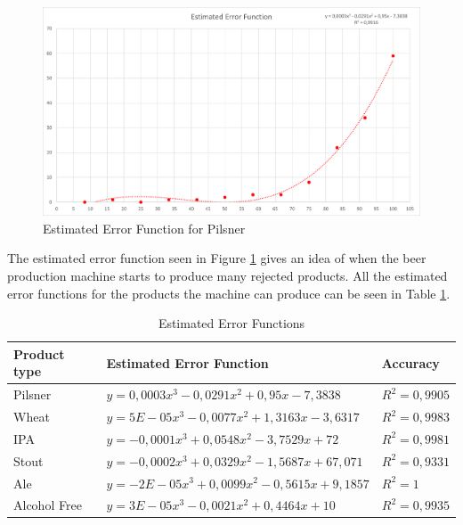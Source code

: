 
\begin{figure}[ht]
	\centering
	\includegraphics[width=1\linewidth]{images/errorfunction/pilsner.png}
	\caption{Estimated Error Function for Pilsner}
	\label{figure:ef_pilsner}
\end{figure}

The estimated error function seen in Figure \ref{figure:ef_pilsner} gives an
idea of when the beer production machine starts to produce many rejected
products. All the estimated error functions for the products the machine can
produce can be seen in Table \ref{table:eef}.

\begin{table}[ht]
     \begin{tabularx}{\textwidth}{|>{\RaggedRight}p{3cm}|>{\RaggedRight}X|>{\RaggedRight}p{3cm}|}
     \hline
     \textbf{Product type} & \textbf{Estimated Error Function} & \textbf{Accuracy} \\
     \hline
     Pilsner & \(y = 0,0003x^3 - 0,0291x^2 + 0,95x - 7,3838\) & \(R^2 = 0,9905\) \\
     \hline
     Wheat & \(y = 5E-05x^3 - 0,0077x^2 + 1,3163x - 3,6317\) & \(R^2 = 0,9983\) \\
     \hline
     IPA & \(y = -0,0001x^3 + 0,0548x^2 - 3,7529x + 72\) & \(R^2 = 0,9981\) \\
     \hline
     Stout & \(y = -0,0002x^3 + 0,0329x^2 - 1,5687x + 67,071\) & \(R^2 = 0,9331\) \\
     \hline
     Ale & \(y = -2E-05x^3 + 0,0099x^2 - 0,5615x + 9,1857\) & \(R^2 = 1\) \\
     \hline
     Alcohol Free & \(y = 3E-05x^3 - 0,0021x^2 + 0,4464x + 10\) & \(R^2 = 0,9935\) \\
     \hline
    \end{tabularx}
    \caption{Estimated Error Functions}
    \label{table:eef}
\end{table}

